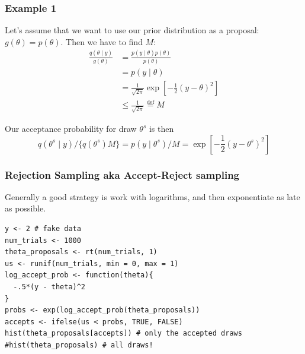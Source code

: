 \documentclass{beamer}
\begin{document}
\begin{frame}[fragile]
\frametitle{Example 1}

Let's assume that we want to use our prior distribution as a proposal: $g(\theta) = p(\theta)$. Then we have to find $M$:
\begin{align*}
\frac{q(\theta\mid y)}{g(\theta)} &= \frac{p(y \mid \theta) p(\theta)}{p(\theta)} \\
&= p(y \mid \theta) \\
&= \frac{1}{\sqrt{2\pi}} \exp\left[-\frac{1}{2} (y-\theta)^2 \right] \\
&\le \frac{1}{\sqrt{2\pi}} \overset{\text{def}}{=} M
\end{align*}

Our acceptance probability for draw $\theta^s$ is then
\[
q(\theta^s \mid y) / \{ q(\theta^s)  M\} = p(y \mid \theta^s) / M = \exp\left[-\frac{1}{2} (y-\theta^s)^2 \right]
\]


\end{frame}
\begin{frame}[fragile]
\frametitle{Rejection Sampling aka Accept-Reject sampling}

Generally a good strategy is work with logarithms, and then exponentiate as late as possible.
\begin{verbatim}
y <- 2 # fake data
num_trials <- 1000
theta_proposals <- rt(num_trials, 1)
us <- runif(num_trials, min = 0, max = 1)
log_accept_prob <- function(theta){
  -.5*(y - theta)^2
}
probs <- exp(log_accept_prob(theta_proposals))
accepts <- ifelse(us < probs, TRUE, FALSE)
hist(theta_proposals[accepts]) # only the accepted draws
#hist(theta_proposals) # all draws!
\end{verbatim}

\end{frame}
\end{document}
